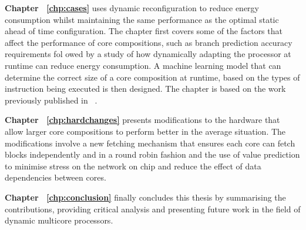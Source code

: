 \textbf{Chapter ~\ref{chp:cases}} uses dynamic reconfiguration to reduce energy consumption whilst maintaining the same performance as the optimal static ahead of time configuration.
The chapter first covers some of the factors that affect the performance of core compositions, such as branch prediction accuracy requirements fol owed by a study of how dynamically adapting the processor at runtime can reduce energy consumption.
A machine learning model that can determine the correct size of a core composition at runtime, based on the types of instruction being executed is then designed.
The chapter is based on the work previously published in ~\cite{micolet2017cases}.

\textbf{Chapter ~\ref{chp:hardchanges}} presents modifications to the hardware that allow larger core compositions to perform better in the average situation.
The modifications involve a new fetching mechanism that ensures each core can fetch blocks independently and in a round robin fashion and the use of value prediction to minimise stress on the network on chip and reduce the effect of data dependencies between cores.

\textbf{Chapter ~\ref{chp:conclusion}} finally concludes this thesis by summarising the contributions, providing critical analysis and presenting future work in the field of dynamic multicore processors.